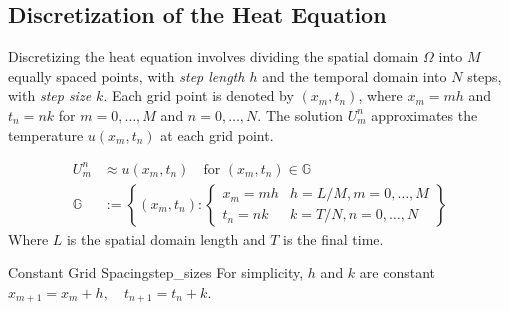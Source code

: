 \subsection{Discretization of the Heat Equation}
Discretizing the heat equation involves dividing the spatial domain \(\Omega\) into \(M\) equally spaced points, with \emph{step length \(h\)} and the temporal domain into \(N\) steps, with \emph{step size \(k\)}.
Each grid point is denoted by \((x_m, t_n)\), where \(x_m = m h\) and \(t_n = n k\) for \(m = 0, \ldots, M\) and \(n = 0, \ldots, N\). The solution \(U_m^n\) approximates the temperature \(u(x_m, t_n)\) at each grid point.

\begin{minipage}[l]{0.45\textwidth}
  \begin{align*}
    U_m^n      & \approx u(x_m, t_n) \quad \text{for } (x_m, t_n) \in \mathbb{G} \\[1em]
    \mathbb{G} & := \left\{(x_m, t_n):
    \begin{cases}
      x_m = m h & h = L/M, m = 0, \ldots, M \\
      t_n = n k & k = T/N, n = 0, \ldots, N
    \end{cases}\right\}
  \end{align*}\label{eq:grid_points}
  Where \(L\) is the spatial domain length and \(T\) is the final time.
  \begin{remark}{Constant Grid Spacing}{step_sizes}
    For simplicity, \(h\) and \(k\) are constant \( x_{m+1} = x_m + h,\quad t_{n+1} = t_n + k \).
  \end{remark}

\end{minipage}
\hspace{0.05\textwidth}
\begin{minipage}[r]{0.45\textwidth}
\end{minipage}

